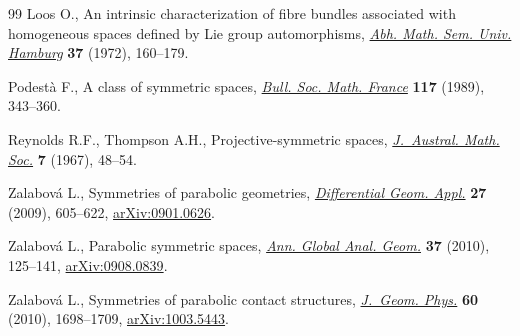 \documentclass[pdftex]{sigma}
\numberwithin{equation}{section}
\begin{document}
\begin{thebibliography}{99}
Loos O., An intrinsic characterization of f\/ibre bundles associated with
 homogeneous spaces def\/ined by {L}ie group automorphisms, \href{https://doi.org/10.1007/BF02999694}{\textit{Abh. Math.
 Sem. Univ. Hamburg}} \textbf{37} (1972), 160--179.

Podest\`a F., A class of symmetric spaces, \href{https://doi.org/10.24033/bsmf.2127}{\textit{Bull. Soc. Math. France}}
 \textbf{117} (1989), 343--360.

Reynolds R.F., Thompson A.H., Projective-symmetric spaces, \href{https://doi.org/10.1017/S1446788700005085}{\textit{J.~Austral.
 Math. Soc.}} \textbf{7} (1967), 48--54.

Zalabov\'a L., Symmetries of parabolic geometries, \href{https://doi.org/10.1016/j.difgeo.2009.03.001}{\textit{Differential Geom.
 Appl.}} \textbf{27} (2009), 605--622, \href{http://arxiv.org/abs/0901.0626}{arXiv:0901.0626}.

Zalabov\'a L., Parabolic symmetric spaces, \href{https://doi.org/10.1007/s10455-009-9177-5}{\textit{Ann. Global Anal. Geom.}}
 \textbf{37} (2010), 125--141, \href{http://arxiv.org/abs/0908.0839}{arXiv:0908.0839}.

Zalabov\'a L., Symmetries of parabolic contact structures, \href{https://doi.org/10.1016/j.geomphys.2010.06.013}{\textit{J.~Geom.
 Phys.}} \textbf{60} (2010), 1698--1709, \href{http://arxiv.org/abs/1003.5443}{arXiv:1003.5443}.

\end{thebibliography}\LastPageEnding
\end{document}
